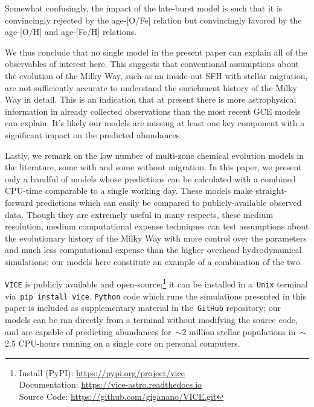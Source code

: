 \documentclass[fleqn, usenatbib]{mnras}
\begin{document}
Somewhat confusingly, the impact of the late-burst model is such that it is 
convincingly rejected by the age-[O/Fe] relation but convincingly favored by 
the age-[O/H] and age-[Fe/H] relations. 
\par 
We thus conclude that no single model in the present paper can explain all of 
the observables of interest here. This suggests that 
conventional assumptions about the evolution of the Milky Way, such as an 
inside-out SFH with stellar migration, are not sufficiently accurate to 
understand the enrichment history of the Milky Way in detail. This is an 
indication that at present there is more astrophysical information in already 
collected observations than the most recent GCE models can explain. It's likely 
our models are missing at least one key component with a significant impact on 
the predicted abundances. 
\par 
Lastly, we remark on the low number of multi-zone chemical evolution models in 
the literature, some with and some without migration. In this paper, we present 
only a handful of models whose predictions can be calculated with a combined 
CPU-time comparable to a single working day. These models make straight-forward 
predictions which can easily be compared to publicly-available observed data. 
Though they are extremely useful in many respects, these medium resolution, 
medium computational expense techniques can test assumptions about the 
evolutionary history of the Milky Way with more control over the parameters and 
much less computational expense than the higher overhead hydrodynamical 
simulations; our models here constitute an example of a combination of the two. 
\par 
\texttt{VICE} is publicly available and open-source;\footnote{
	Install (PyPI): \url{https://pypi.org/project/vice} \\ 
	Documentation: \url{https://vice-astro.readthedocs.io} \\ 
	Source Code: \url{https://github.com/giganano/VICE.git} 
} it can be installed in a~\texttt{Unix} terminal via~\texttt{pip install vice}. 
\texttt{Python} code which runs the simulations presented in this paper is 
included as supplementary material in the~\texttt{GitHub} repository; our 
models can be ran directly from a terminal without modifying the source code, 
and are capable of predicting abundances for~$\sim$2 million stellar 
populations in~$\sim$2.5 CPU-hours running on a single core on personal 
computers. 
\end{document}
